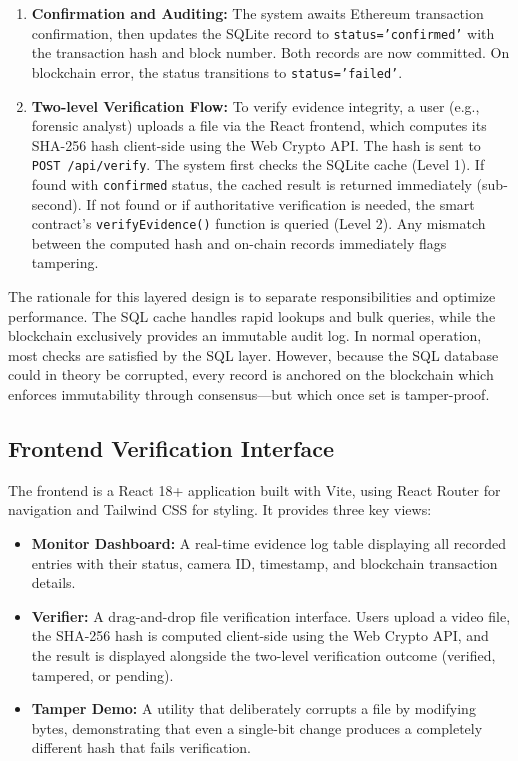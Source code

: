 \documentclass[conference]{IEEEtran}
\begin{document}
\begin{enumerate}
    \item \textbf{Confirmation and Auditing:} The system awaits Ethereum transaction confirmation, then updates the SQLite record to \texttt{status='confirmed'} with the transaction hash and block number. Both records are now committed. On blockchain error, the status transitions to \texttt{status='failed'}.

    \item \textbf{Two-level Verification Flow:} To verify evidence integrity, a user (e.g., forensic analyst) uploads a file via the React frontend, which computes its SHA-256 hash client-side using the Web Crypto API. The hash is sent to \texttt{POST /api/verify}. The system first checks the SQLite cache (Level 1). If found with \texttt{confirmed} status, the cached result is returned immediately (sub-second). If not found or if authoritative verification is needed, the smart contract's \texttt{verifyEvidence()} function is queried (Level 2). Any mismatch between the computed hash and on-chain records immediately flags tampering.
\end{enumerate}

The rationale for this layered design is to separate responsibilities and optimize performance. The SQL cache handles rapid lookups and bulk queries, while the blockchain exclusively provides an immutable audit log. In normal operation, most checks are satisfied by the SQL layer. However, because the SQL database could in theory be corrupted, every record is anchored on the blockchain which enforces immutability through consensus---but which once set is tamper-proof.

\subsection{Frontend Verification Interface}

The frontend is a React 18+ application built with Vite, using React Router for navigation and Tailwind CSS for styling. It provides three key views:

\begin{itemize}
    \item \textbf{Monitor Dashboard:} A real-time evidence log table displaying all recorded entries with their status, camera ID, timestamp, and blockchain transaction details.
    \item \textbf{Verifier:} A drag-and-drop file verification interface. Users upload a video file, the SHA-256 hash is computed client-side using the Web Crypto API, and the result is displayed alongside the two-level verification outcome (verified, tampered, or pending).
    \item \textbf{Tamper Demo:} A utility that deliberately corrupts a file by modifying bytes, demonstrating that even a single-bit change produces a completely different hash that fails verification.
\end{itemize}
\end{document}

